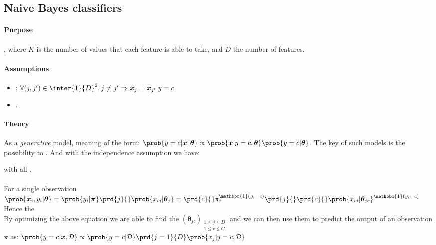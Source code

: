 \subsection{Naive Bayes classifiers}
\paragraph{Purpose}
, where $K$ is the 
number of values that each feature is able to take, and $D$ the number of features.

\paragraph{Assumptions}
\begin{itemize}
    \item {}: $\forall (j,j')\in
        \inter{1}{D}^{2}, j\neq j'\Rightarrow \bm{x}_{j}\perp\bm{x}_{j'}|y=c$
    \item {}.
\end{itemize}

\paragraph{Theory}
As a \emph{generative} model, meaning of the form:
$\prob{y=c|\bm{x}, \bm{\theta}} \propto \prob{\bm{x}|y=c,\bm{\theta}}
\prob{y=c|\bm{\theta}}$. The key of such models is the possibility
to . And with the independence assumption we 
have:
\begin{center}
\end{center}
with all .\\
\\
For a single observation
$\prob{\bm{x}_{i}, y_{i}|\bm{\theta}} = \prob{y_{i}|\bm{\pi}}\prd{j}{}\prob{x_{ij}|\bm{\theta}_{j}}= 
\prd{c}{}\pi_{c}^{\mathbbm{1}(y_{i}=c)}\prd{j}{}\prd{c}{}\prob{x_{ij}|
\bm{\theta}_{jc}}^{\mathbbm{1}(y_{i}=c)}
$\\ 
Hence the \\
By optimizing the above equation we are able to find the $\left(\bm{\theta}_{jc}\right)_{\substack{
1\leq j \leq D\\ 1\leq c\leq C}}$ and we can then use them to
predict the output of an observation $\bm{x}$ as: $\prob{y=c|\bm{x},\mathcal{D}} \propto \prob{y=c|\mathcal{D}}\prd{j=1}{D}\prob{x_{j}|y=c,\mathcal{D}}$

